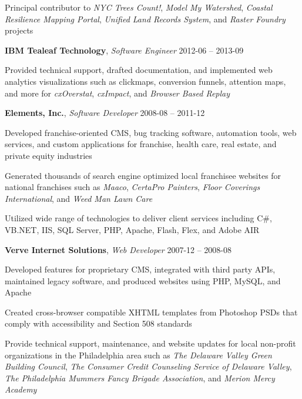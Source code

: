 \documentclass[12pt,a4paper]{article}
\newcommand{\workhead}[3]{\textbf{#1}, \emph{#2} \hfill #3}
\newcommand{\li}{\item[--]}
\begin{document}
\begin{description}[leftmargin=0em]
\begin{itemize*}
            \li Principal contributor to \emph{NYC Trees Count!}, \emph{Model My Watershed}, \emph{Coastal Resilience Mapping Portal}, \emph{Unified Land Records System}, and \emph{Raster Foundry} projects
        \end{itemize*}
    \item
        \workhead{IBM Tealeaf Technology}{Software Engineer}{2012-06 -- 2013-09}
        \begin{itemize*}
            \li Provided technical support, drafted documentation, and implemented web analytics visualizations such as clickmaps, conversion funnels, attention maps, and more for \emph{\mbox{cxOverstat}}, \emph{cxImpact}, and \emph{Browser Based Replay}
        \end{itemize*}

    \item
        \workhead{Elements, Inc.}{Software Developer}{2008-08 -- 2011-12}
        \begin{itemize*}
            \li Developed franchise-oriented CMS, bug tracking software, automation tools, web services, and custom applications for franchise, health care, real estate, and private equity industries
            \li Generated thousands of search engine optimized local franchisee websites for national franchises such as \emph{Maaco}, \emph{\mbox{CertaPro} Painters}, \emph{Floor Coverings International}, and \emph{Weed Man Lawn Care}
            \li Utilized wide range of technologies to deliver client services including C\#, VB.NET, IIS, SQL Server, PHP, Apache, Flash, Flex, and Adobe AIR
        \end{itemize*}

    \item
        \workhead{Verve Internet Solutions}{Web Developer}{2007-12 -- 2008-08}
        \begin{itemize*}
            \li Developed features for proprietary CMS, integrated with third party APIs, maintained legacy software, and produced websites using PHP, MySQL, and Apache
            \li Created cross-browser compatible XHTML templates from Photoshop PSDs that comply with accessibility and Section 508 standards
            \li Provide technical support, maintenance, and website updates for local non-profit organizations in the Philadelphia area such as \emph{The Delaware Valley Green Building Council}, \emph{The Consumer Credit Counseling Service of Delaware Valley}, \emph{The Philadelphia Mummers Fancy Brigade Association}, and \emph{Merion Mercy Academy}
        \end{itemize*}


\end{description}
\end{document}
